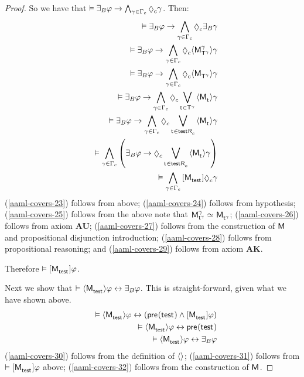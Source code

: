\begin{proof}
So we have that $\entails \someactsBs \phi \implies \bigwedge_{\gamma \in \Gamma_\agentC} \possibleC \gamma$.
Then:
\begin{eqnarray}
    && \entails \someactsBs \phi \implies \bigwedge_{\gamma \in \Gamma_\agentC} \possibleC \someactsBs \gamma \label{aaml-covers-23}\\
    && \entails \someactsBs \phi \implies \bigwedge_{\gamma \in \Gamma_\agentC} \possibleC \actionE{\aPModel[\gamma]{\aStatesT[\gamma]}} \gamma \label{aaml-covers-24}\\
    && \entails \someactsBs \phi \implies \bigwedge_{\gamma \in \Gamma_\agentC} \possibleC \actionE{\aPModel{\aStatesT[\gamma]}} \gamma \label{aaml-covers-25}\\
    && \entails \someactsBs \phi \implies \bigwedge_{\gamma \in \Gamma_\agentC} \possibleC \bigvee_{\aStateT \in \aStatesT[\gamma]} \actionE{\aPModel{\aStateT}} \gamma \label{aaml-covers-26}\\
    && \entails \someactsBs \phi \implies \bigwedge_{\gamma \in \Gamma_\agentC} \possibleC \bigvee_{\aStateT \in \aSuccessorsC{\aStateTest}} \actionE{\aPModel{\aStateT}} \gamma \label{aaml-covers-27}\\
    && \entails \bigwedge_{\gamma \in \Gamma_\agentC} \left(\someactsBs \phi \implies \possibleC \bigvee_{\aStateT \in \aSuccessorsC{\aStateTest}} \actionE{\aPModel{\aStateT}} \gamma\right) \label{aaml-covers-28}\\
    && \entails \bigwedge_{\gamma \in \Gamma_\agentC} \actionA{\aPModel{\aStateTest}} \possibleC \gamma \label{aaml-covers-29}
\end{eqnarray}
(\ref{aaml-covers-23}) follows from above;
(\ref{aaml-covers-24}) follows from hypothesis;
(\ref{aaml-covers-25}) follows from the above note that $\aPModel[\gamma]{\aStateT[\gamma]} \bisimilar \aPModel{\aStateT[\gamma]}$;
(\ref{aaml-covers-26}) follows from \axiomRamlK{} axiom {\bf AU};
(\ref{aaml-covers-27}) follows from the construction of $\aModel$ and propositional disjunction introduction;
(\ref{aaml-covers-28}) follows from propositional reasoning; and
(\ref{aaml-covers-29}) follows from \axiomRamlK{} axiom {\bf AK}.

Therefore $\entails \actionA{\aPModel{\aStateTest}} \phi$.

Next we show that $\entails \actionE{\aPModel{\aStateTest}} \phi \iff \someactsBs \phi$. 
This is straight-forward, given what we have shown above.
\begin{eqnarray}
    && \entails \actionE{\aPModel{\aStateTest}} \phi \iff (\aPrecondition(\aStateTest) \land \actionA{\aPModel{\aStateTest}} \phi) \label{aaml-covers-30}\\
    && \entails \actionE{\aPModel{\aStateTest}} \phi \iff \aPrecondition(\aStateTest) \label{aaml-covers-31}\\
    && \entails \actionE{\aPModel{\aStateTest}} \phi \iff \someactsBs \phi \label{aaml-covers-32}
\end{eqnarray}
(\ref{aaml-covers-30}) follows from the definition of ${\langle {} \rangle}$;
(\ref{aaml-covers-31}) follows from $\entails \actionA{\aPModel{\aStateTest}} \phi$ above;
(\ref{aaml-covers-32}) follows from the construction of $\aModel$.


\end{proof}
